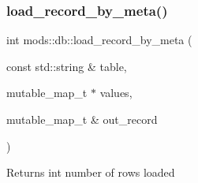 \subsubsection{\texorpdfstring{load\+\_\+record\+\_\+by\+\_\+meta()}{load\_record\_by\_meta()}}
{\footnotesize\ttfamily int mods\+::db\+::load\+\_\+record\+\_\+by\+\_\+meta (\begin{DoxyParamCaption}\item[{const std\+::string \&}]{table,  }\item[{mutable\+\_\+map\+\_\+t $\ast$}]{values,  }\item[{mutable\+\_\+map\+\_\+t \&}]{out\+\_\+record }\end{DoxyParamCaption})}

\begin{DoxyReturn}{Returns}
int number of rows loaded 
\end{DoxyReturn}
